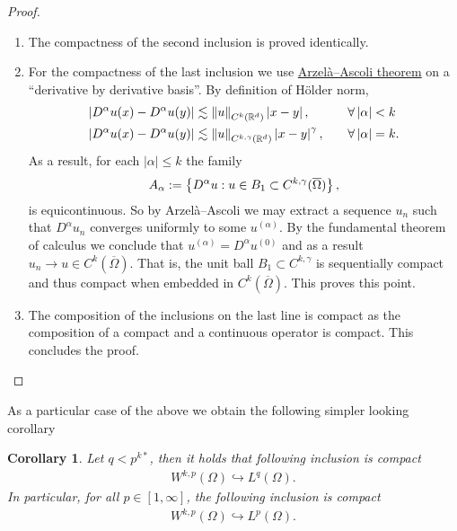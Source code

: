 \documentclass[12pt]{article}
\newtheorem{corollary}{Corollary}
\theoremstyle{remark}
\renewcommand{\norm}[1]{\left\lVert #1 \right\rVert}\renewcommand{\abs}[1]{\left| #1 \right|}
\begin{document}
\begin{proof}
\begin{enumerate}
		\item The compactness of the second inclusion is proved identically.
		\item For the compactness of the last inclusion we use \href{https://en.wikipedia.org/wiki/Arzel%C3%A0%E2%80%93Ascoli_theorem#:~:text=%2C%20%C2%A7IV.6.7}{Arzelà–Ascoli theorem} on a ``derivative by derivative basis''. By definition of Hölder norm,
		      \begin{align*}
			      \abs{D^\alpha u(x)- D^\alpha u(y)} & \lesssim  \norm{u}_{C^{k}(\R^d)}\abs{x-y} ,                 &  & \quad\forall \abs{\alpha}<k  \\
			      \abs{D^\alpha u(x)- D^\alpha u(y)} & \lesssim  \norm{u}_{C^{k,\gamma }(\R^d)}\abs{x-y}^\gamma  , &  & \quad\forall \abs{\alpha}=k.
		      \end{align*}
		      As a result, for each $\abs{\alpha}\leq k$ the family
		      \begin{align*}
			      A_\alpha:=\left\{D^\alpha u: u \in B_1 \subset C^{k,\gamma }(\overline{\Omega})\right\},
		      \end{align*}
		      is equicontinuous. So by Arzelà–Ascoli we may extract a sequence $u_{n}$ such that $D^\alpha u_n$ converges uniformly to some $u^{(\alpha)}$. By the fundamental theorem of calculus we conclude that $u^{(\alpha)}=D^\alpha u^{(0)}$ and as a result $u_n \to u \in C^k(\overline{\Omega})$. That is, the unit ball $B_1 \subset C^{k,\gamma }$ is sequentially compact and thus compact when embedded in  $C^k(\overline{\Omega})$. This proves this point.

		\item The composition of the inclusions on the last line is compact as the composition of a compact and a continuous operator is compact.    This concludes the proof.
	\end{enumerate}
\end{proof}
As a particular case of the above we obtain the following simpler looking corollary
\begin{corollary}\label{simple embedding}
	Let $q< p^{k*}$, then it holds that following inclusion is compact
	\begin{align*}
		W^{k,p}(\Omega) \hookrightarrow L^q(\Omega).
	\end{align*}
	In particular, for all $p \in [1, \infty]$, the following inclusion is compact
	\begin{align*}
		W^{k,p}(\Omega) \hookrightarrow L^p(\Omega).
	\end{align*}
\end{corollary}
\end{document}
